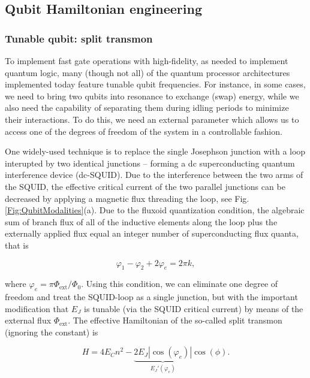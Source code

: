 \documentclass[aip,apr,twocolumn,showpacs,superscriptaddress,groupedaddress,nofootinbib,reprint]{revtex4-1}  %
\begin{document}
\subsection{\label{sec:HamEng}Qubit Hamiltonian engineering}
\subsubsection{Tunable qubit: split transmon}
To implement fast gate operations with high-fidelity, as needed to implement quantum logic, many (though not all\cite{McKay2016}) of the quantum processor architectures implemented today feature tunable qubit frequencies\cite{DiCarlo2009,Barends2014,Kelly2015,Reagor2018}. For instance, in some cases, we need to bring two qubits into resonance to exchange (swap) energy, while we also need the capability of separating them during idling periods to minimize their interactions. To do this, we need an external parameter which allows us to access one of the degrees of freedom of the system in a controllable fashion.

One widely-used technique is to replace the single Josephson junction with a loop interupted by two identical junctions -- forming a dc superconducting quantum interference device (dc-SQUID)\cite{Tinkham2004}. Due to the interference between the two arms of the SQUID, the effective critical current of the two parallel junctions can be decreased by applying a magnetic flux threading the loop, see Fig. \ref{Fig:QubitModalities}(a). Due to the fluxoid quantization condition, the algebraic sum of branch flux of all of the inductive elements along the loop plus the externally applied flux equal an integer number of superconducting flux quanta, that is

\begin{equation}
\varphi_1 - \varphi_2 + 2\varphi_{e} = 2\pi k,
\label{Eq:FluxoidQuantization}
\end{equation}

\noindent where $\varphi_{e} = \pi \Phi_{\text{ext}}/\Phi_0$. Using this condition, we can eliminate one degree of freedom and treat the SQUID-loop as a single junction, but with the important modification that $E_J$ is tunable (via the SQUID critical current) by means of the external flux $\Phi_{\text{ext}}$. The effective Hamiltonian of the so-called split transmon (ignoring the constant) is

\begin{equation}
H = 4E_C n^2 - \underbrace{2E_J \left| \cos\left(\varphi_e\right)\right|}_{E_{J}'(\varphi_e)}\cos(\phi).
\label{Eq:HsplitTransmon}
\end{equation}
\end{document}
